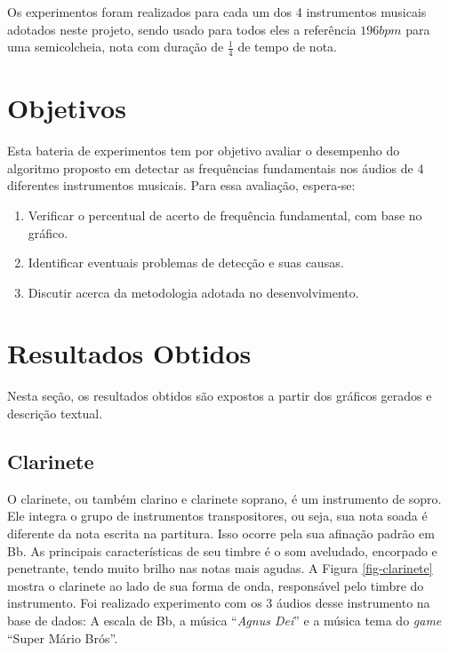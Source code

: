 Os experimentos foram realizados para cada um dos 4 instrumentos musicais adotados neste projeto, sendo usado para todos eles a referência $196 bpm$ para uma semicolcheia, nota com duração de $\frac{1}{4}$ de tempo de nota.







\section{Objetivos}

Esta bateria de experimentos tem por objetivo avaliar o desempenho do algoritmo proposto em detectar as frequências fundamentais nos áudios de 4 diferentes instrumentos musicais. Para essa avaliação, espera-se:


\begin{enumerate}
	\item Verificar o percentual de acerto de frequência fundamental, com base no gráfico.
	\item Identificar eventuais problemas de detecção e suas causas.
	\item Discutir acerca da metodologia adotada no desenvolvimento.
\end{enumerate}

\section{Resultados Obtidos}

Nesta seção, os resultados obtidos são expostos a partir dos gráficos gerados e descrição textual.

\subsection{Clarinete}

O clarinete, ou também clarino e clarinete soprano, é um instrumento de sopro. Ele integra o grupo de instrumentos transpositores, ou seja, sua nota soada é diferente da nota escrita na partitura. Isso ocorre pela sua afinação padrão em Bb. As principais características de seu timbre é o som aveludado, encorpado e penetrante, tendo muito brilho nas notas mais agudas. A Figura \ref{fig-clarinete} mostra o clarinete ao lado de sua forma de onda, responsável pelo timbre do instrumento. Foi realizado experimento com os 3 áudios desse instrumento na base de dados: A escala de Bb, a música ``\textit{Agnus Dei}'' e a música tema do \textit{game} ``Super Mário Brós''.

